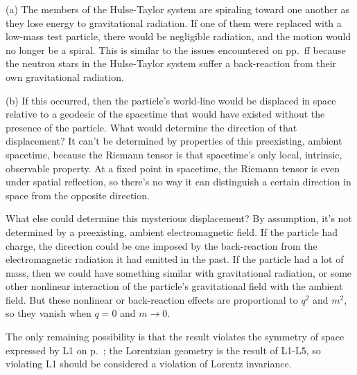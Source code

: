 
(a) The members of the Hulse-Taylor system are spiraling toward one another as they lose energy to
gravitational radiation. If one of them were replaced with a low-mass test particle, there
would be negligible radiation, and the motion would no longer be a spiral. This is similar
to the issues encountered on pp.~\pageref{sec:chiao-paradox}ff because the neutron stars in
the Hulse-Taylor system suffer a back-reaction from their own gravitational radiation.

(b) If this occurred, then the particle's world-line would be displaced in space relative
to a geodesic of the spacetime that would have existed without the presence of the particle.
What would determine the direction of that displacement?
It can't be determined by properties of this preexisting, ambient spacetime, because
the Riemann tensor is that spacetime's only local, intrinsic, observable property.
At a fixed point in spacetime, the Riemann tensor is even under spatial reflection, so there's no way it can distinguish
a certain direction in space from the opposite direction.

What else could determine this mysterious displacement?
By assumption, it's not determined by a preexisting, ambient electromagnetic field.
If the particle had charge, the direction could be one imposed by the back-reaction from the electromagnetic
radiation it had emitted in the past. If the particle had a lot of mass, then we could have
something similar with gravitational radiation, or some other nonlinear interaction of the
particle's gravitational field with the ambient field. But these nonlinear or back-reaction
effects are proportional to $q^2$ and $m^2$, so they vanish when $q=0$ and $m\rightarrow 0$.

The only remaining possibility is that the result violates the symmetry of space expressed by L1 on p.~\pageref{sec:lorentz-geometry};
the Lorentzian geometry is the result of L1-L5, so violating L1 should be considered a violation of Lorentz
invariance.
